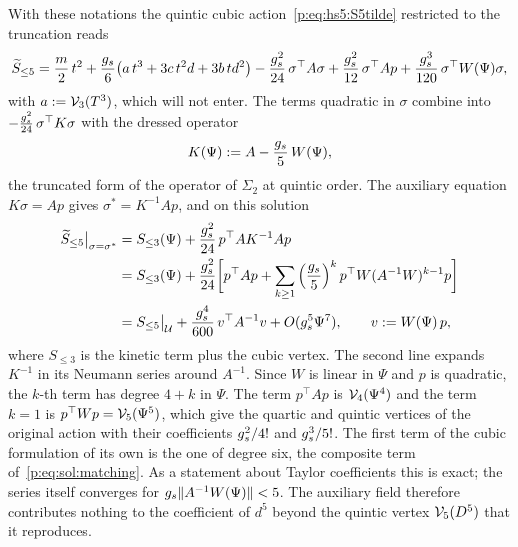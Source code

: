 With these notations the quintic cubic action~\eqref{p:eq:hs5:S5tilde} restricted to the truncation reads
\begin{equation}
  \label{eq:sol:d5:action}
  \caction[\le 5]
    = \frac{m}{2} \, t^2
      + \frac{\gs}{6} \big( a \, t^3 + 3 c \, t^2 d + 3 b \, t d^2 \big)
      - \frac{\gs^2}{24} \, \sigma^\top A \sigma
      + \frac{\gs^2}{12} \, \sigma^\top A p
      + \frac{\gs^3}{120} \, \sigma^\top W(\Psi) \sigma,
\end{equation}
with $a := \vertex{3}(T^3)$, which will not enter.
The terms quadratic in $\sigma$ combine into $- \tfrac{\gs^2}{24} \, \sigma^\top K \sigma$ with the dressed operator
\begin{equation}
  K(\Psi)
    := A - \frac{\gs}{5} \, W(\Psi),
\end{equation}
the truncated form of the operator of $\Sigma_2$ at quintic order.
The auxiliary equation $K \sigma = A p$ gives $\sigma^* = K^{-1} A p$, and on this solution
\begin{equation}
  \label{eq:sol:d5:sigma-eliminated}
  \begin{aligned}
    \caction[\le 5] \big|_{\sigma = \sigma^*}
      &
      = S_{\le 3}(\Psi)
        + \frac{\gs^2}{24} \, p^\top A K^{-1} A p
    \\
      &
      = S_{\le 3}(\Psi)
        + \frac{\gs^2}{24} \bigg[
          p^\top A p
          + \sum_{k \ge 1} \Big( \frac{\gs}{5} \Big)^k \, p^\top W (A^{-1} W)^{k - 1} p
        \bigg]
    \\
      &
      = S_{\le 5} \big|_{\mathcal U}
        + \frac{\gs^4}{600} \, v^\top A^{-1} v
        + O(\gs^5 \Psi^7),
      \qquad
      v
        := W(\Psi) \, p,
  \end{aligned}
\end{equation}
where $S_{\le 3}$ is the kinetic term plus the cubic vertex.
The second line expands $K^{-1}$ in its Neumann series around $A^{-1}$.
Since $W$ is linear in $\Psi$ and $p$ is quadratic, the $k$-th term has degree $4 + k$ in $\Psi$.
The term $p^\top A p$ is $\vertex{4}(\Psi^4)$ and the term $k = 1$ is $p^\top W p = \vertex{5}(\Psi^5)$, which give the quartic and quintic vertices of the original action with their coefficients $\gs^2 / 4!$ and $\gs^3 / 5!$.
The first term of the cubic formulation of its own is the one of degree six, the composite term of~\eqref{p:eq:sol:matching}.
As a statement about Taylor coefficients this is exact; the series itself converges for $\gs \lVert A^{-1} W(\Psi) \rVert < 5$.
The auxiliary field therefore contributes nothing to the coefficient of $d^5$ beyond the quintic vertex $\vertex{5}(D^5)$ that it reproduces.

